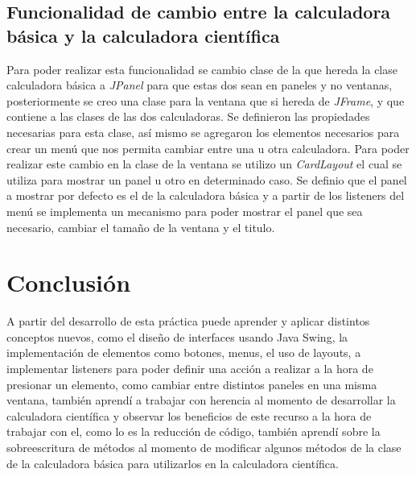\documentclass[]{article}
\begin{document}
\subsection{Funcionalidad de cambio entre la calculadora básica y la calculadora científica}

Para poder realizar esta funcionalidad se cambio clase de la que hereda la clase calculadora básica a \textit{JPanel} para que estas dos sean en paneles y no ventanas, posteriormente se creo una clase para la ventana que si hereda de \textit{JFrame}, y que contiene a las clases de las dos calculadoras. Se definieron las propiedades necesarias para esta clase, así mismo se agregaron los elementos necesarios para crear un menú que nos permita cambiar entre una u otra calculadora. Para poder realizar este cambio en la clase de la ventana se utilizo un \textit{CardLayout} el cual se utiliza para mostrar un panel u otro en determinado caso. Se definio que el panel a mostrar por defecto es el de la calculadora básica y a partir de los listeners del menú se implementa un mecanismo para poder mostrar el panel que sea necesario, cambiar el tamaño de la ventana y el titulo.

\section{Conclusión}

A partir del desarrollo de esta práctica puede aprender y aplicar distintos conceptos nuevos, como el diseño de interfaces usando Java Swing, la implementación de elementos como botones, menus, el uso de layouts, a implementar listeners para poder definir una acción a realizar a la hora de presionar un elemento, como cambiar entre distintos paneles en una misma ventana, también aprendí a trabajar con herencia al momento de desarrollar la calculadora científica y observar los beneficios de este recurso a la hora de trabajar con el, como lo es la reducción de código, también aprendí sobre la sobreescritura de métodos al momento de modificar algunos métodos de la clase de la calculadora básica para utilizarlos en la calculadora científica.
\end{document}
